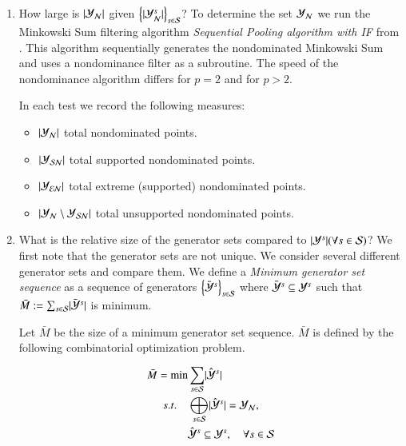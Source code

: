 \begin{enumerate}
	\item  How large is $\lvert \mathcal{Y}_{\mathcal{N}} \rvert$ given $\left\{\lvert \mathcal{Y}_{\mathcal{N}}^s \rvert \right\}_{s \in \mathcal{S}}$?
To determine the set $\mathcal{Y}_{\mathcal{N}}$ we run the Minkowski Sum filtering algorithm \emph{Sequential Pooling algorithm with IF} from \citep[Algorithm 1]{Kerberenes2022}. This algorithm sequentially generates the nondominated Minkowski Sum and uses a nondominance filter as a subroutine. The speed of the nondominance algorithm differs for $p=2$ and for $p>2$.

In each test we record the following measures:
\begin{itemize}
	\item 
$\lvert \mathcal{Y}_{\mathcal{N}} \rvert$ total nondominated points.
	\item 
$\lvert \mathcal{Y}_{\mathcal{SN}} \rvert$ total supported nondominated points.
	\item 
$\lvert \mathcal{Y}_{\mathcal{EN}} \rvert$ total extreme (supported) nondominated points.
	\item 
$\lvert \mathcal{Y}_{\mathcal{N}} \setminus \mathcal{Y}_{\mathcal{SN}} \rvert$ total unsupported nondominated points.
\end{itemize}



\item What is the relative size of the generator sets compared to $\lvert \mathcal{Y}^s \rvert (\forall s \in \mathcal{S})$?
We first note that the generator sets are not unique. We consider several different generator sets and compare them. We define a \emph{Minimum generator set sequence} as a sequence of generators $\left\{ \bar{\mathcal{Y}}^{s}  \right\}_{s \in \mathcal{S}}$ where $\bar{\mathcal{Y}}^{s} \subseteq \mathcal{Y}^s$ such that $\bar{M} := \sum_{s \in \mathcal{S}} \lvert \bar{\mathcal{Y}}^{s} \rvert$ is minimum.

Let $\bar{M}$ be the size of a minimum generator set sequence. $\bar{M}$ is defined by the following combinatorial optimization problem.

\begin{align}
	\bar{M}  =  \min& \sum_{s \in \mathcal{S}} \lvert \hat{\mathcal{Y}}^s \rvert  \\
	s.t. \quad & \bigoplus_{s \in \mathcal{S}} \lvert \hat{\mathcal{Y}}^s \rvert = \mathcal{Y}_{\mathcal{N}},  \label{constr:comb spanning}\\
		   & \hat{\mathcal{Y}}^s \subseteq \mathcal{Y}^s, \quad \forall s \in \mathcal{S}
\end{align}


\end{enumerate}
